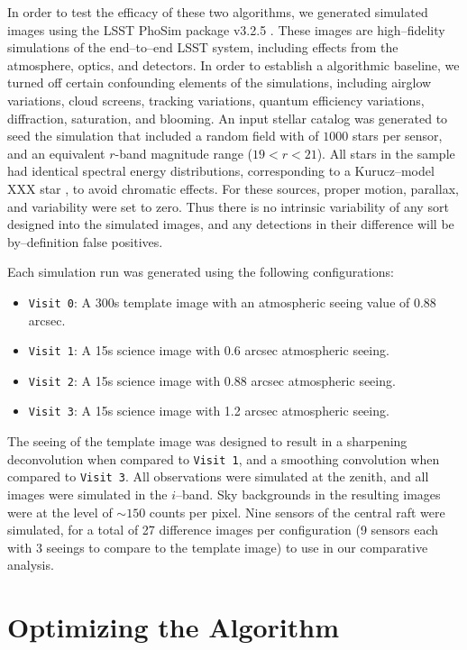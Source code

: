 \documentclass[floatfix, apj]{emulateapj}
\begin{document}
In order to test the efficacy of these two algorithms, we generated simulated images using the LSST PhoSim package v3.2.5 \cite{phosim}.
These images are high--fidelity simulations of the end--to--end LSST system, including effects from the atmosphere, optics, and detectors.
In order to establish a algorithmic baseline, we turned off certain confounding elements of the simulations, including airglow variations, cloud screens, tracking variations, quantum efficiency variations, diffraction, saturation, and blooming.
An input stellar catalog was generated to seed the simulation that included a random field with of $1000$ stars per sensor, and an equivalent $r$-band magnitude range ($19<r<21$).
All stars in the sample had identical spectral energy distributions, corresponding to a Kurucz--model XXX star \cite{kurucz}, to avoid chromatic effects.
For these sources, proper motion, parallax, and variability were set to zero.
Thus there is no intrinsic variability of any sort designed into the simulated images, and any detections in their difference will be by--definition false positives.

Each simulation run was generated using the following configurations:
\begin{itemize}
\item {\tt Visit 0}: A 300s template image with an atmospheric seeing value of 0.88 arcsec.
\item {\tt Visit 1}: A 15s science image with 0.6 arcsec atmospheric seeing.
\item {\tt Visit 2}: A 15s science image with 0.88 arcsec atmospheric seeing.
\item {\tt Visit 3}: A 15s science image with 1.2 arcsec atmospheric seeing.
\end{itemize}
The seeing of the template image was designed to result in a sharpening deconvolution when compared to {\tt Visit 1}, and a smoothing convolution when compared to {\tt Visit 3}.
All observations were simulated at the zenith, and all images were simulated in the $i$--band.
Sky backgrounds in the resulting images were at the level of $\sim 150$ counts per pixel.
Nine sensors of the central raft were simulated, for a total of 27 difference images per configuration (9 sensors each with 3 seeings to compare to the template image) to use in our comparative analysis.

\section{Optimizing the Algorithm}
\end{document}

